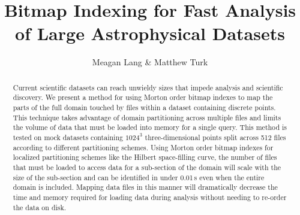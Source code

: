 \documentclass[apjl]{emulateapj}
\begin{document}

\title{Bitmap Indexing for Fast Analysis of Large Astrophysical Datasets}

\author{Meagan Lang \& Matthew Turk}




\begin{abstract}
Current scientific datasets can reach unwieldy sizes that impede analysis and scientific discovery. We present a method for using Morton order bitmap indexes to map the parts of the full domain touched by files within a dataset containing discrete points. This technique takes advantage of domain partitioning across multiple files and limits the volume of data that must be loaded into memory for a single query. This method is tested on mock datasets containing $1024^3$ three-dimensional points split across 512 files according to different partitioning schemes. Using Morton order bitmap indexes for localized partitioning schemes like the Hilbert space-filling curve, the number of files that must be loaded to access data for a sub-section of the domain will scale with the size of the sub-section and can be identified in under 0.01\,s even when the entire domain is included. Mapping data files in this manner will dramatically decrease the time and memory required for loading data during analysis without needing to re-order the data on disk.
\end{abstract}


\end{document}
